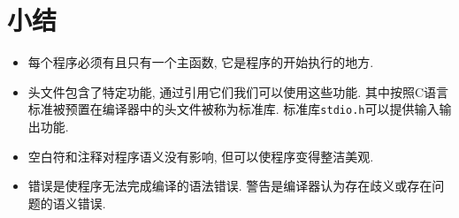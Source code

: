     \section*{小结}
        \begin{itemize}
            \item 每个程序必须有且只有一个主函数, 它是程序的开始执行的地方.
            \item 头文件包含了特定功能, 通过引用它们我们可以使用这些功能. 其中按照C语言标准被预置在编译器中的头文件被称为标准库. 标准库\texttt{stdio.h}可以提供输入输出功能.
            \item 空白符和注释对程序语义没有影响, 但可以使程序变得整洁美观.
            \item 错误是使程序无法完成编译的语法错误. 警告是编译器认为存在歧义或存在问题的语义错误.
        \end{itemize}